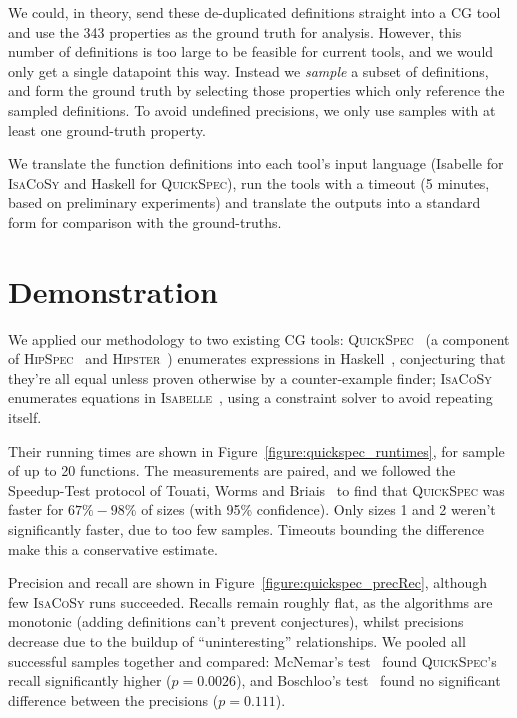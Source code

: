 \documentclass[]{default}
\begin{document}
We could, in theory, send these de-duplicated definitions straight into a CG
tool and use the 343 properties as the ground truth for analysis. However, this
number of definitions is too large to be feasible for current tools, and we
would only get a single datapoint this way. Instead we \emph{sample} a subset of
definitions, and form the ground truth by selecting those properties which only
reference the sampled definitions. To avoid undefined precisions, we only use
samples with at least one ground-truth property.

We translate the function definitions into each tool's input language (Isabelle
for \textsc{IsaCoSy} and Haskell for \textsc{QuickSpec}), run the tools with a
timeout (5 minutes, based on preliminary experiments) and translate the outputs
into a standard form for comparison with the ground-truths.

\section{Demonstration}

We applied our methodology to two existing CG tools:
\textsc{QuickSpec}~\cite{QuickSpec} (a component of
\textsc{HipSpec}~\cite{Claessen_hipspec:automating} and
\textsc{Hipster}~\cite{Hipster}) enumerates expressions in
Haskell~\cite{marlow2010haskell}, conjecturing that they're all equal unless
proven otherwise by a counter-example finder;
\textsc{IsaCoSy}~\cite{johansson2009isacosy} enumerates equations in
\textsc{Isabelle}~\cite{nipkow2002isabelle}, using a constraint solver to avoid
repeating itself.

Their running times are shown in Figure~\ref{figure:quickspec_runtimes}, for
sample of up to 20 functions. The measurements are paired, and we followed the
Speedup-Test protocol of Touati, Worms and Briais~\cite{touati2013speedup} to
find that \textsc{QuickSpec} was faster for $67\%-98\%$ of sizes (with 95\%
confidence). Only sizes 1 and 2 weren't significantly faster, due to too few
samples. Timeouts bounding the difference make this a conservative estimate.

Precision and recall are shown in Figure~\ref{figure:quickspec_precRec},
although few \textsc{IsaCoSy} runs succeeded. Recalls remain roughly flat, as
the algorithms are monotonic (adding definitions can't prevent conjectures),
whilst precisions decrease due to the buildup of ``uninteresting''
relationships. We pooled all successful samples together and compared: McNemar's
test~\cite{mcnemar1947note} found \textsc{QuickSpec}'s recall significantly
higher ($p = 0.0026$), and Boschloo's test~\cite{lydersen2009recommended} found
no significant difference between the precisions ($p = 0.111$).
\end{document}
